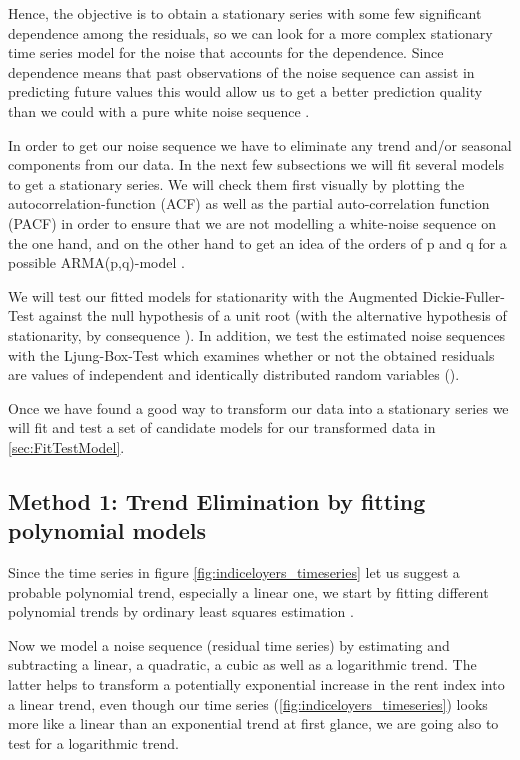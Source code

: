 \documentclass[11pt,a4paper]{article}
\begin{document}
Hence, the objective is to obtain a stationary series with some few significant dependence among the residuals, so we can look for a more complex stationary time series model for the noise that accounts for the dependence.
Since dependence means that past observations of the noise sequence can assist in predicting future values this would allow us to get a better prediction quality than we could with a pure white noise sequence \cite[p.~35]{bd02}.

In order to get our noise sequence we have to eliminate any trend and/or seasonal components from our data.
In the next few subsections we will fit several models to get a stationary series.
We will check them first visually by plotting the autocorrelation-function (ACF) as well as the partial auto-correlation function (PACF) in order to ensure that we are not modelling a white-noise sequence on the one hand, and on the other hand to get an idea of the orders of p and q for a possible ARMA(p,q)-model \cite[pp.~83--110]{bd02}.

We will test our fitted models for stationarity with the Augmented Dickie-Fuller-Test against the null hypothesis of a unit root (with the alternative hypothesis of stationarity, by consequence \citep{adf}).
In addition, we test the estimated noise sequences with the Ljung-Box-Test which examines whether or not the obtained residuals are values of independent and identically distributed random variables (\citep{LjungBox78}).

Once we have found a good way to transform our data into a stationary series we will fit and test a set of candidate models for our transformed data in \cref{sec:FitTestModel}.



\subsection{Method 1: Trend Elimination by fitting polynomial models}

Since the time series in figure \ref{fig:indiceloyers_timeseries} let us suggest a probable polynomial trend, especially a linear one, we start by fitting different polynomial trends by ordinary least squares estimation \cite[p.~11]{htf09}.

Now we model a noise sequence (residual time series) by estimating and subtracting a linear, a quadratic, a cubic as well as a logarithmic trend.
The latter  helps to transform a potentially exponential increase in the rent index into a linear trend, even though our time series (\cref{fig:indiceloyers_timeseries}) looks more like a linear than an exponential trend at first glance, we are going also to test for a logarithmic trend.
\end{document}
